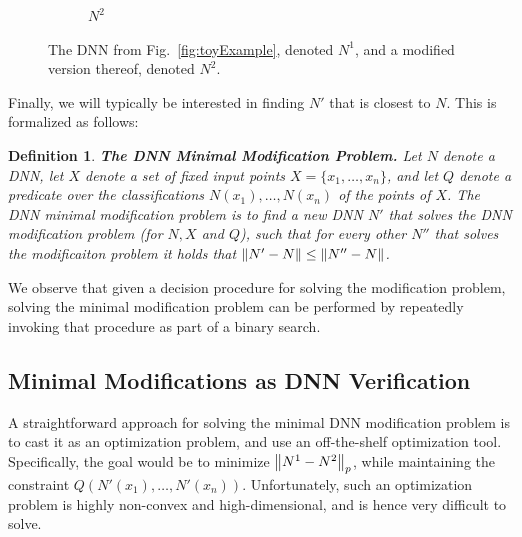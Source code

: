 \documentclass{easychair}
\newtheorem{definition}{Definition}
\newcommand{\guy}[1]{\marginpar{\textcolor{orange}{Guy: #1}}}
\begin{document}
\begin{figure}[htp]
\begin{subfigure}{0.5\linewidth}
    \caption{$N^2$}
  \end{subfigure}
  \caption{The DNN from Fig.~\ref{fig:toyExample}, denoted $N^1$, and
    a modified version thereof, denoted $N^2$.}
  \label{fig:toyExampleModified}
\end{figure}

Finally, we will typically be interested in finding $N'$ that is
closest to $N$. This is formalized as follows:
\begin{definition}\textbf{The DNN Minimal Modification Problem.}
  Let $N$ denote a DNN, let $X$ denote a set of fixed input points
  $X=\{x_1, \ldots, x_n\}$, and let $Q$ denote a predicate over the
  classifications $N(x_1),\ldots,N(x_n)$ of the points of $X$. The
  \emph{DNN minimal modification problem} is to find a new DNN $N'$
  that solves the DNN modification problem (for $N, X$ and $Q$), such that for every other
  $N''$ that solves the modificaiton problem it holds that
  $\left\lVert N'-N\right\rVert\leq \left\lVert N''-N\right\rVert$.
\end{definition}
We observe that given a decision procedure for solving the modification
problem, solving the minimal modification problem can be performed by
repeatedly invoking that procedure as part of a binary search.

\subsection{Minimal Modifications as DNN Verification}

A straightforward approach for solving the minimal DNN modification
problem is to cast it as an optimization problem, and use an
off-the-shelf optimization tool. Specifically, the goal would be to
minimize $\left\lVert N^1-N^2\right\rVert_p$, while maintaining the constraint
\guy{Ben, where did underscore p come from?}
$Q(N'(x_1),\ldots, N'(x_n))$. Unfortunately, such an optimization
problem is highly non-convex and high-dimensional, and is hence very
difficult to solve.
\end{document}
